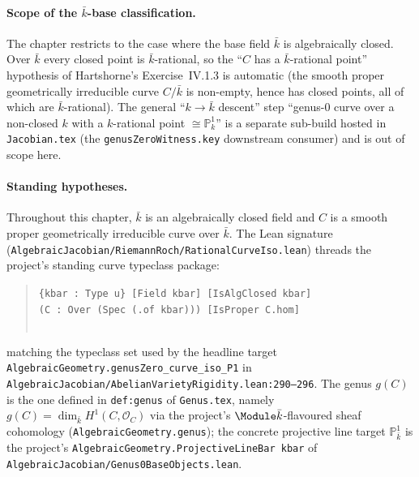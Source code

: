 \paragraph{Scope of the \(\bar k\)-base classification.} The chapter restricts
to the case where the base field \(\bar k\) is algebraically closed. Over $\bar
k$ every closed point is $\bar k$-rational, so the ``$C$ has a $\bar
k$-rational point'' hypothesis of Hartshorne's Exercise~IV.1.3 is automatic
(the smooth proper geometrically irreducible curve \(C / \bar k\) is non-empty,
hence has closed points, all of which are \(\bar k\)-rational). The general
``\(k \to \bar k\) descent'' step ``genus-\(0\) curve over a non-closed \(k\) with
a \(k\)-rational point \(\cong \mathbb P^1_k\)'' is a separate sub-build hosted
in \texttt{Jacobian.tex} (the \texttt{genusZeroWitness.key} downstream
consumer) and is out of scope here.
\paragraph{Standing hypotheses.} Throughout this chapter, \(\bar k\) is an
algebraically closed field and \(C\) is a smooth proper geometrically
irreducible curve over \(\bar k\). The Lean signature
(\texttt{AlgebraicJacobian/RiemannRoch/RationalCurveIso.lean}) threads the
project's standing curve typeclass package:
\begin{quote}
  \texttt{\{kbar : Type u\} [Field kbar] [IsAlgClosed kbar]\\
   (C : Over (Spec (.of kbar))) [IsProper C.hom]\\
   \phantom{}\\
   \phantom{}}
\end{quote}
matching the typeclass set used by the headline target
\texttt{AlgebraicGeometry.genusZero\_curve\_iso\_P1} in
\texttt{AlgebraicJacobian/AbelianVarietyRigidity.lean:290--296}. The genus
\(g(C)\) is the one defined in \texttt{def:genus} of \texttt{Genus.tex},
namely \(g(C) = \dim_{\bar k} H^1(C, \mathcal O_C)\) via the project's
\(\Module \bar k\)-flavoured sheaf cohomology
(\texttt{AlgebraicGeometry.genus}); the concrete projective line target
\(\mathbb P^1_{\bar k}\) is the project's
\texttt{AlgebraicGeometry.ProjectiveLineBar~kbar} of
\texttt{AlgebraicJacobian/Genus0BaseObjects.lean}.
